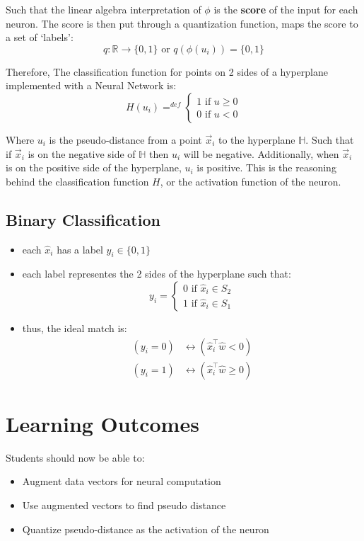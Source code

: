 \documentclass[12pt]{book}
\begin{document}
Such that the linear algebra interpretation of $\phi$ is the 
\textbf{score} of the input for each neuron. The score is 
then put through a quantization
function, maps the score to a set of `labels':
\[q : \mathbb{R} \rightarrow \{0,1\} \text{ or } q(\phi(u_i)) = \{0,1\}\]

Therefore, The classification function for points on 2 sides of a 
hyperplane implemented with a Neural Network is:
\[H(u_i) =^{def} \begin{cases} 1\text{ if }u\geq0\\0\text{ if }u<0\end{cases} \]

Where $u_i$ is the pseudo-distance from a point $\vec x_i$ to the 
hyperplane $\mathbb{H}$. Such that 
if $\vec x_i$ is on the negative side of $\mathbb{H}$
then $u_i$ will be negative. Additionally, 
when $\vec x_i$ is on the positive side of 
the hyperplane, $u_i$ is positive. This is the reasoning behind the
classification function $H$, or the activation function of the neuron.

\subsection*{Binary Classification}
\begin{itemize}
        \item each $\hat x_i$ has a label $y_i \in \{0,1\}$
        \item each label representes the 2 sides of the hyperplane
                such that:
                \[y_i=\begin{cases}0\text{ if } \hat x_i \in S_2\\1\text{ if } \hat x_i \in S_1 \end{cases}\]
        \item thus, the ideal match is:
                \begin{align*}
                        (y_i=0)&\leftrightarrow(\hat x_i^\top \hat w < 0)\\
                        (y_i=1)&\leftrightarrow(\hat x_i^\top \hat w \geq 0)
                \end{align*}
\end{itemize}

\section*{Learning Outcomes}
Students should now be able to:
\begin{itemize}
        \item Augment data vectors for neural computation
        \item Use augmented vectors to find pseudo distance
        \item Quantize pseudo-distance as the activation of the neuron
\end{itemize}
\end{document}
